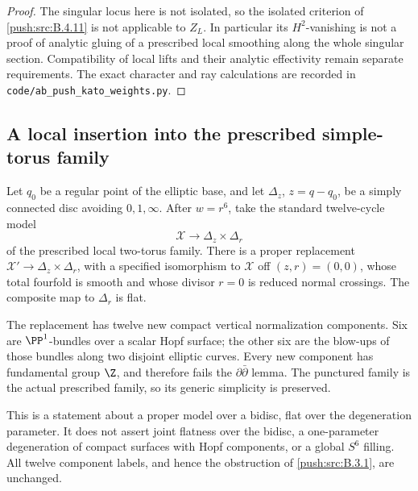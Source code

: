 \begin{proof}
The singular locus here is not isolated, so the isolated
criterion of \ref{push:src:B.4.11} is not applicable to $Z_L$.
In particular its $H^2$-vanishing is not a proof of analytic
gluing of a prescribed local smoothing along the whole
singular section.  Compatibility of local lifts and their
analytic effectivity remain separate requirements.
The exact character and ray calculations are recorded in
\texttt{code/ab\_push\_kato\_weights.py}.
\end{proof}

\subsection{A local insertion into the prescribed simple-torus family}

\begin{proposition}\label{push:src:B.4.15}\label{push:B415}
Let $q_0$ be a regular point of the elliptic base, and let
$\Delta_z$, $z=q-q_0$, be a simply connected disc avoiding
$0,1,\infty$. After $w=r^6$, take the standard twelve-cycle
model
\[
 \mathcal X\longrightarrow\Delta_z\times\Delta_r
\]
of the prescribed local two-torus family. There is a proper
replacement $\mathcal X'\to\Delta_z\times\Delta_r$, with
a specified isomorphism to $\mathcal X$ off $(z,r)=(0,0)$,
whose total fourfold is smooth and whose divisor $r=0$ is
reduced normal crossings. The composite map to $\Delta_r$
is flat.

The replacement has twelve new compact vertical normalization
components. Six are $\PP^1$-bundles over a scalar Hopf
surface; the other six are the blow-ups of those bundles
along two disjoint elliptic curves. Every new component
has fundamental group $\Z$, and therefore fails the
$\partial\bar\partial$ lemma. The punctured family is the
actual prescribed family, so its generic simplicity is
preserved.

This is a statement about a proper model over a bidisc,
flat over the degeneration parameter. It does not assert
joint flatness over the bidisc, a one-parameter degeneration
of compact surfaces with Hopf components, or a global
$S^6$ filling. All twelve component labels, and hence the
obstruction of \ref{push:src:B.3.1}, are unchanged.
\end{proposition}


